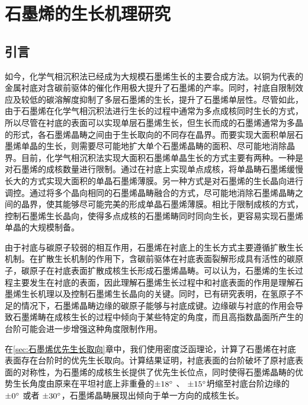 \def\CCluster#1{\rm{C_{#1}}}
\chapter{石墨烯的生长机理研究}
\label{cap:石墨烯的生长机理研究}
\section{引言}
如今，化学气相沉积法已经成为大规模石墨烯生长的主要合成方法。以铜为代表的金属衬底对含碳前驱体的催化作用极大提升了石墨烯的产率。同时，衬底自限制效应及较低的碳溶解度抑制了多层石墨烯的生长，提升了石墨烯单层性。尽管如此，由于石墨烯在化学气相沉积法进行生长的过程中通常为多点成核同时生长的方式，所以尽管在衬底的表面可以实现单层石墨烯生长，但生长而成的石墨烯通常为多晶的形式，各石墨烯晶畴之间由于生长取向的不同存在晶界。而要实现大面积单层石墨烯单晶的生长，则需要尽可能地扩大单个石墨烯晶畴的面积、尽可能地消除晶界。目前，化学气相沉积法实现大面积石墨烯单晶生长的方式主要有两种。一种是对石墨烯的成核数量进行限制。通过在衬底上实现单点成核，将单晶畴石墨烯缓慢长大的方式实现大面积的单晶石墨烯薄膜。另一种方式是对石墨烯的生长晶向进行调控。通过将多个晶向相同的石墨烯晶畴融合的方式，尽可能地消除石墨烯晶畴之间的晶界，使其能够尽可能完美的形成单晶石墨烯薄膜。相比于限制成核的方式，控制石墨烯生长晶向，使得多点成核的石墨烯畴同时同向生长，更容易实现石墨烯单晶的大规模制备。%

由于衬底与碳原子较弱的相互作用，石墨烯在衬底上的生长方式主要遵循扩散生长机制。在扩散生长机制的作用下，含碳前驱体在衬底表面裂解形成具有活性的碳原子，碳原子在衬底表面扩散成核生长形成石墨烯晶畴。可以认为，石墨烯的生长过程主要发生在衬底的表面，因此理解石墨烯生长过程中和衬底表面的作用是理解石墨烯生长机理以及控制石墨烯生长晶向的关键。同时，已有研究表明，在氢原子不足的情况下，石墨烯晶畴边缘的碳原子能够与衬底成键。边缘碳与衬底的作用会导致石墨烯畴在成核生长的过程中倾向于某些特定的角度，而且高指数晶面所产生的台阶可能会进一步增强这种角度限制作用。

在\ref{sec:石墨烯优先生长取向}章中，我们使用密度泛函理论，计算了石墨烯在衬底表面存在台阶时的优先生长取向。计算结果证明，衬底表面的台阶破坏了原衬底表面的对称性，为石墨烯的成核生长提供了优先生长位点，同时使得石墨烯晶畴的优势生长角度由原来在平坦衬底上非重叠的$\SI{\pm 18}{\degree}$ 、 $\SI{\pm 15}{\degree}$坍缩至衬底台阶边缘的$\SI{\pm 0}{\degree}$ 或者 $\SI{\pm 30}{\degree}$，石墨烯晶畴展现出倾向于单一方向的成核生长。

